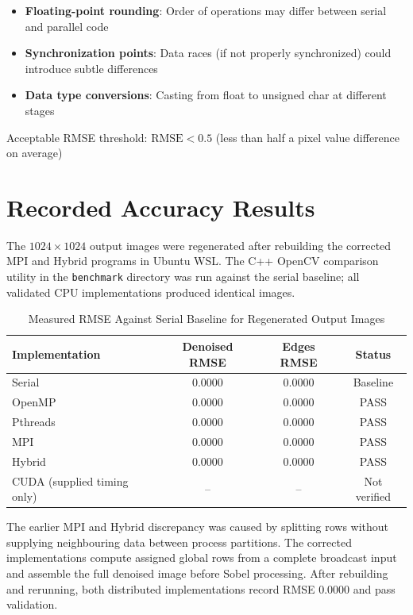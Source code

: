 \documentclass[12pt,a4paper]{report}
\begin{document}
\begin{itemize}
    \item \textbf{Floating-point rounding}: Order of operations may differ between serial and parallel code
    \item \textbf{Synchronization points}: Data races (if not properly synchronized) could introduce subtle differences
    \item \textbf{Data type conversions}: Casting from float to unsigned char at different stages
\end{itemize}

Acceptable RMSE threshold: $\text{RMSE} < 0.5$ (less than half a pixel value difference on average)

\section{Recorded Accuracy Results}

The $1024 \times 1024$ output images were regenerated after rebuilding the corrected MPI
and Hybrid programs in Ubuntu WSL. The C++ OpenCV comparison utility in the
\texttt{benchmark} directory was run against the serial baseline; all validated CPU
implementations produced identical images.

\begin{table}[H]
    \centering
    \begin{tabular}{|l|c|c|c|}
    \hline
    \textbf{Implementation} & \textbf{Denoised RMSE} & \textbf{Edges RMSE} & \textbf{Status} \\
    \hline
    Serial & 0.0000 & 0.0000 & Baseline \\
    OpenMP & 0.0000 & 0.0000 & PASS \\
    Pthreads & 0.0000 & 0.0000 & PASS \\
    MPI  & 0.0000 & 0.0000 & PASS \\
    Hybrid  & 0.0000 & 0.0000 & PASS \\
    CUDA (supplied timing only) & -- & -- & Not verified \\
    \hline
    \end{tabular}
    \caption{Measured RMSE Against Serial Baseline for Regenerated Output Images}
\end{table}

The earlier MPI and Hybrid discrepancy was caused by splitting rows without supplying
neighbouring data between process partitions. The corrected implementations compute assigned
global rows from a complete broadcast input and assemble the full denoised image before
Sobel processing. After rebuilding and rerunning, both distributed implementations record
RMSE 0.0000 and pass validation.
\end{document}
